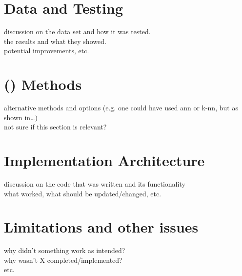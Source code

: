 \label{chap:chapter5}

\section{Data and Testing}
\label{sec:data_and_testing}
discussion on the data set and how it was tested. \\
the results and what they showed.  \\
potential improvements, etc.

\section{ () Methods}
\label{sec:ai_methods}
alternative methods and options (e.g. one could have used ann or k-nn, but as shown in\ldots) \\
not sure if this section is relevant?

\section{Implementation Architecture}
\label{sec:implemented_architecture}
discussion on the code that was written and its functionality \\
what worked, what should be updated/changed, etc.

\section{Limitations and other issues}
\label{sec:limitations_and_issues}
why didn't something work as intended? \\
why wasn't X completed/implemented? \\
etc.
